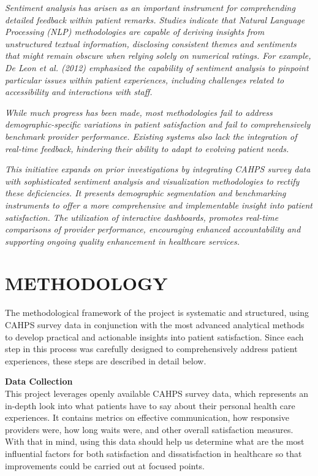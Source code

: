 \textit{Sentiment analysis has arisen as an important instrument for comprehending detailed feedback within patient remarks. Studies indicate that Natural Language Processing (NLP) methodologies are capable of deriving insights from unstructured textual information, disclosing consistent themes and sentiments that might remain obscure when relying solely on numerical ratings. For example, De Leon et al. (2012) emphasized the capability of sentiment analysis to pinpoint particular issues within patient experiences, including challenges related to accessibility and interactions with staff.}

\textit{While much progress has been made, most methodologies fail to address demographic-specific variations in patient satisfaction and fail to comprehensively benchmark provider performance. Existing systems also lack the integration of real-time feedback, hindering their ability to adapt to evolving patient needs.}

\textit{This initiative expands on prior investigations by integrating CAHPS survey data with sophisticated sentiment analysis and visualization methodologies to rectify these deficiencies. It presents demographic segmentation and benchmarking instruments to offer a more comprehensive and implementable insight into patient satisfaction. The utilization of interactive dashboards, promotes real-time comparisons of provider performance, encouraging enhanced accountability and supporting ongoing quality enhancement in healthcare services.}


\section{METHODOLOGY}

\IEEEPARstart The methodological framework of the project is systematic and structured, using CAHPS survey data in conjunction with the most advanced analytical methods to develop practical and actionable insights into patient satisfaction. Since each step in this process was carefully designed to comprehensively address patient experiences, these steps are described in detail below.

\textbf{Data Collection}\\
This project leverages openly available CAHPS survey data, which represents an in-depth look into what patients have to say about their personal health care experiences. It contains metrics on effective communication, how responsive providers were, how long waits were, and other overall satisfaction measures. With that in mind, using this data should help us determine what are the most influential factors for both satisfaction and dissatisfaction in healthcare so that improvements could be carried out at focused points.

